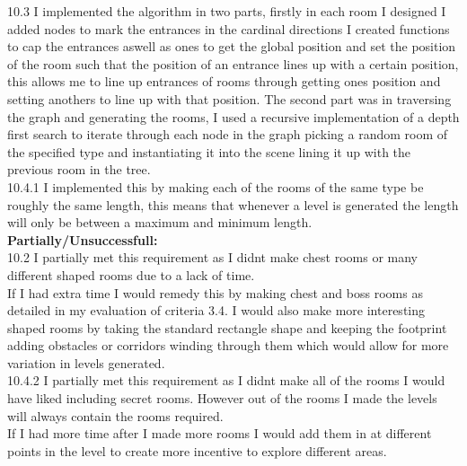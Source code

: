 \documentclass{article}
\begin{document}
        10.3 I implemented the algorithm in two parts, firstly in each room I designed I added nodes to mark the entrances in the cardinal directions I created functions to cap the entrances aswell as ones to get the global position and set the position of the room such that the position of an entrance lines up with a certain position, this allows me to line up entrances of rooms through getting ones position and setting anothers to line up with that position. The second part was in traversing the graph and generating the rooms, I used a recursive implementation of a depth first search to iterate through each node in the graph picking a random room of the specified type and instantiating it into the scene lining it up with the previous room in the tree.\\
        10.4.1 I implemented this by making each of the rooms of the same type be roughly the same length, this means that whenever a level is generated the length will only be between a maximum and minimum length.\\
        \textbf{Partially/Unsuccessfull:}\\
        10.2 I partially met this requirement as I didnt make chest rooms or many different shaped rooms due to a lack of time.\\
        If I had extra time I would remedy this by making chest and boss rooms as detailed in my evaluation of criteria 3.4. I would also make more interesting shaped rooms by taking the standard rectangle shape and keeping the footprint adding obstacles or corridors winding through them which would allow for more variation in levels generated.\\
        10.4.2 I partially met this requirement as I didnt make all of the rooms I would have liked including secret rooms. However out of the rooms I made the levels will always contain the rooms required.\\
        If I had more time after I made more rooms I would add them in at different points in the level to create more incentive to explore different areas.\\
\end{document}
